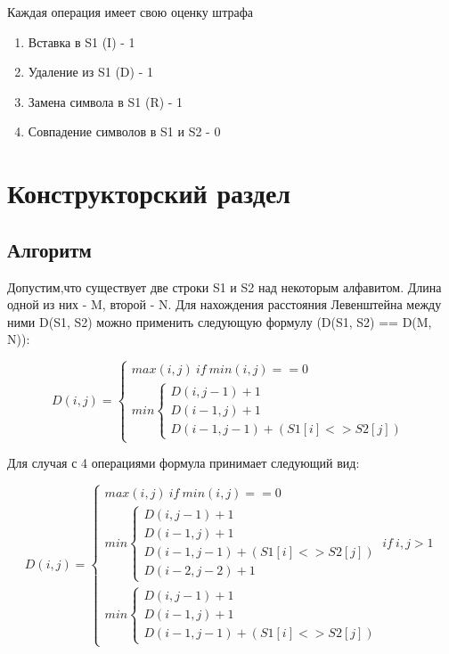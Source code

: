 \documentclass[a4paper, 14pt]{article}
\begin{document}
	Каждая операция имеет свою оценку штрафа
	
	\begin{enumerate}
		\item Вставка в S1 (I) - 1
		\item Удаление из S1 (D) - 1
		\item Замена символа в S1 (R) - 1
		\item Совпадение символов в S1 и S2 - 0
	\end{enumerate}
	
	\newpage
	\section{Конструкторский раздел}
		
	\subsection{Алгоритм}

	Допустим,что существует две строки S1 и S2 над некоторым алфавитом. Длина одной из них - M, второй - N. Для нахождения расстояния Левенштейна между ними D(S1, S2) можно применить следующую формулу (D(S1, S2) == D(M, N))\cite{Afanasyev92}:
	
	\[
	D(i,j)=\begin{cases}
	max(i,j)\ if\ min(i,j) == 0\\
	min\begin{cases}
	D(i,j-1) + 1\\
	D(i-1,j) + 1\\
	D(i-1,j-1) + (S1[i] <> S2[j])
	\end{cases}
	\end{cases}
	\]
	
	Для случая с 4 операциями формула принимает следующий вид\cite{Vasylenko92}:
	
	\[
	D(i,j)=\begin{cases}
	max(i,j)\ if\ min(i,j) == 0\\
	min\begin{cases}
	D(i,j-1) + 1\\
	D(i-1,j) + 1\\
	D(i-1,j-1) + (S1[i] <> S2[j])\\
	D(i-2,j-2) + 1
	\end{cases} \ if \ i,j>1\\
	min\begin{cases}
	D(i,j-1) + 1\\
	D(i-1,j) + 1\\
	D(i-1,j-1) + (S1[i] <> S2[j])
	\end{cases}
	\end{cases}
	\]
	
\end{document}
